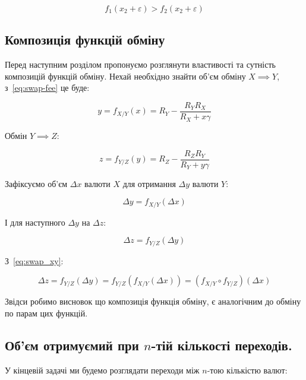 \documentclass[14pt]{extarticle}
\begin{document}
\begin{equation*}
  f_{1}(x_{2} + \varepsilon) > f_{2}(x_{2} + \varepsilon)
\end{equation*}

\subsection{Композиція функцій обміну}\label{sec:func-composition}

Перед наступним розділом пропонуємо розглянути властивості та сутність
композицій функцій обміну. Нехай необхідно знайти об'єм обміну \(X \implies Y\),
з~\eqref{eq:swap-fee} це буде:

\begin{equation*}
	y = f_{X/Y}(x) = R_{Y} - \frac{R_{Y} R_{X}}{R_{X} + x \gamma}
\end{equation*}

Обмін \(Y \implies Z\):

\begin{equation*}
	z = f_{Y/Z}(y) = R_{Z} - \frac{R_{Z} R_{Y}}{R_{Y} + y \gamma}
\end{equation*}

Зафіксуємо об'єм $\Delta x$ валюти $X$ для отримання $\Delta y$ валюти $Y$:

\begin{equation}\label{eq:swap_xy}
	\Delta y = f_{X/Y}(\Delta x)
\end{equation}

І для наступного $\Delta y$ на $\Delta z$:

\begin{equation*}
	\Delta z = f_{Y/Z}(\Delta y)
\end{equation*}

З~\eqref{eq:swap_xy}:

\begin{equation*}
	\Delta z = f_{Y/Z}(\Delta y) = f_{Y/Z}(f_{X/Y}(\Delta x)) = (f_{X/Y} \circ f_{Y/Z})(\Delta x)
\end{equation*}

Звідси робимо висновок що композиція функція обміну, є аналогічним до обміну по
парам цих функцій.

\subsection{Об'єм отримуємий при \(n\)-тій кількості переходів.}\label{sec:nth-swap}

У кінцевій задачі ми будемо розглядати переходи між \(n\)-тою кількістю валют:
\end{document}
